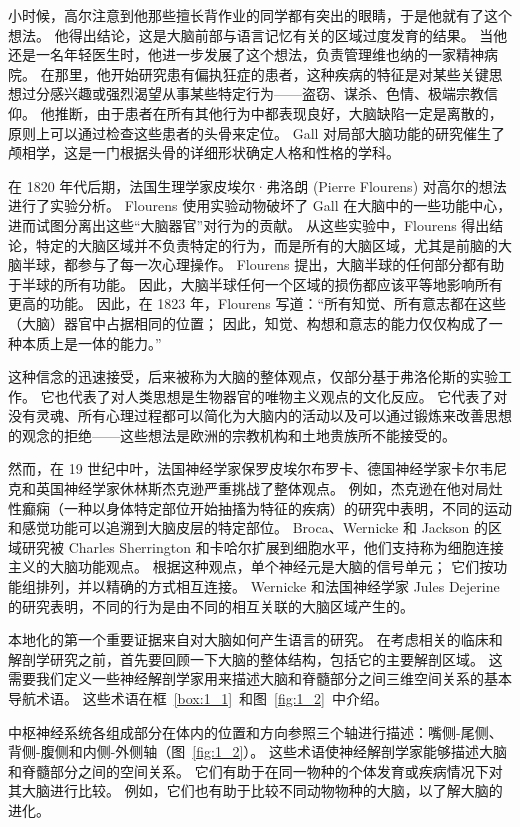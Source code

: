 小时候，高尔注意到他那些擅长背作业的同学都有突出的眼睛，于是他就有了这个想法。
他得出结论，这是大脑前部与语言记忆有关的区域过度发育的结果。
当他还是一名年轻医生时，他进一步发展了这个想法，负责管理维也纳的一家精神病院。
在那里，他开始研究患有偏执狂症的患者，这种疾病的特征是对某些关键思想过分感兴趣或强烈渴望从事某些特定行为——盗窃、谋杀、色情、极端宗教信仰。
他推断，由于患者在所有其他行为中都表现良好，大脑缺陷一定是离散的，原则上可以通过检查这些患者的头骨来定位。
Gall 对局部大脑功能的研究催生了颅相学，这是一门根据头骨的详细形状确定人格和性格的学科。


在 1820 年代后期，法国生理学家皮埃尔·弗洛朗 (Pierre Flourens) 对高尔的想法进行了实验分析。 
Flourens 使用实验动物破坏了 Gall 在大脑中的一些功能中心，进而试图分离出这些“大脑器官”对行为的贡献。
从这些实验中，Flourens 得出结论，特定的大脑区域并不负责特定的行为，而是所有的大脑区域，尤其是前脑的大脑半球，都参与了每一次心理操作。
Flourens 提出，大脑半球的任何部分都有助于半球的所有功能。
因此，大脑半球任何一个区域的损伤都应该平等地影响所有更高的功能。
因此，在 1823 年，Flourens 写道：“所有知觉、所有意志都在这些（大脑）器官中占据相同的位置；
因此，知觉、构想和意志的能力仅仅构成了一种本质上是一体的能力。”


这种信念的迅速接受，后来被称为大脑的整体观点，仅部分基于弗洛伦斯的实验工作。
它也代表了对人类思想是生物器官的唯物主义观点的文化反应。
它代表了对没有灵魂、所有心理过程都可以简化为大脑内的活动以及可以通过锻炼来改善思想的观念的拒绝——这些想法是欧洲的宗教机构和土地贵族所不能接受的。


然而，在 19 世纪中叶，法国神经学家保罗皮埃尔布罗卡、德国神经学家卡尔韦尼克和英国神经学家休林斯杰克逊严重挑战了整体观点。
例如，杰克逊在他对局灶性癫痫（一种以身体特定部位开始抽搐为特征的疾病）的研究中表明，不同的运动和感觉功能可以追溯到大脑皮层的特定部位。
Broca、Wernicke 和 Jackson 的区域研究被 Charles Sherrington 和卡哈尔扩展到细胞水平，他们支持称为细胞连接主义的大脑功能观点。
根据这种观点，单个神经元是大脑的信号单元；
它们按功能组排列，并以精确的方式相互连接。 Wernicke 和法国神经学家 Jules Dejerine 的研究表明，不同的行为是由不同的相互关联的大脑区域产生的。


本地化的第一个重要证据来自对大脑如何产生语言的研究。
在考虑相关的临床和解剖学研究之前，首先要回顾一下大脑的整体结构，包括它的主要解剖区域。
这需要我们定义一些神经解剖学家用来描述大脑和脊髓部分之间三维空间关系的基本导航术语。
这些术语在框~\ref{box:1_1}~和图~\ref{fig:1_2}~中介绍。


\begin{proposition}[神经解剖学导航术语] \label{box:1_1}
	
	\quad \quad 中枢神经系统各组成部分在体内的位置和方向参照三个轴进行描述：嘴侧-尾侧、背侧-腹侧和内侧-外侧轴（图~\ref{fig:1_2}）。
	这些术语使神经解剖学家能够描述大脑和脊髓部分之间的空间关系。
	它们有助于在同一物种的个体发育或疾病情况下对其大脑进行比较。
	例如，它们也有助于比较不同动物物种的大脑，以了解大脑的进化。

\end{proposition}


